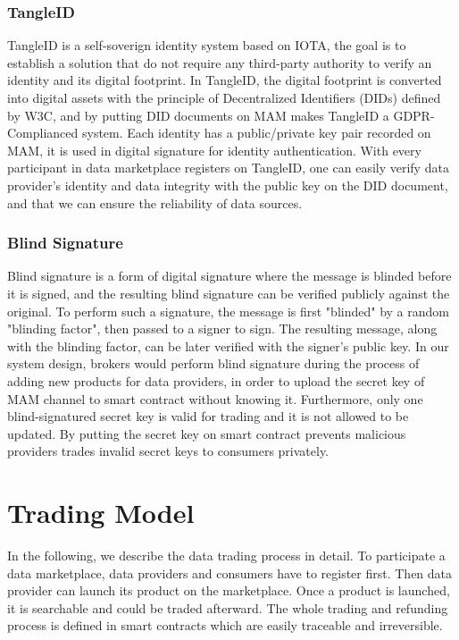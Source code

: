 \documentclass[journal,a4paper]{IEEEtran}
\begin{document}
\subsubsection{TangleID}
TangleID\cite{TangleID} is a self-soverign identity system based on IOTA, the goal is to establish a solution that do not require any third-party authority to verify an identity and its digital footprint. In TangleID, the digital footprint is converted into digital assets with the principle of Decentralized Identifiers (DIDs)\cite{DID} defined by W3C, and by putting DID documents on MAM makes TangleID a GDPR-Complianced system. Each identity has a public/private key pair recorded on MAM, it is used in digital signature for identity authentication. With every participant in data marketplace registers on TangleID, one can easily verify data provider's identity and data integrity with the public key on the DID document, and that we can ensure the reliability of data sources.


\subsubsection{Blind Signature}
Blind signature\cite{blindSig} is a form of digital signature where the message is blinded before it is signed, and the resulting blind signature can be verified publicly against the original. To perform such a signature, the message is first "blinded" by a random "blinding factor", then passed to a signer to sign. The resulting message, along with the blinding factor, can be later verified with the signer's public key. In our system design, brokers would perform blind signature during the process of adding new products for data providers, in order to upload the secret key of MAM channel to smart contract without knowing it. Furthermore, only one blind-signatured secret key is valid for trading and it is not allowed to be updated. By putting the secret key on smart contract prevents malicious providers trades invalid secret keys to consumers privately. 

\section{Trading Model}
In the following, we describe the data trading process in detail. To participate a data marketplace, data providers and consumers have to register first. Then data provider can launch its product on the marketplace. Once a product is launched, it is searchable and could be traded afterward. The whole trading and refunding process is defined in smart contracts which are easily traceable and irreversible.
\end{document}
